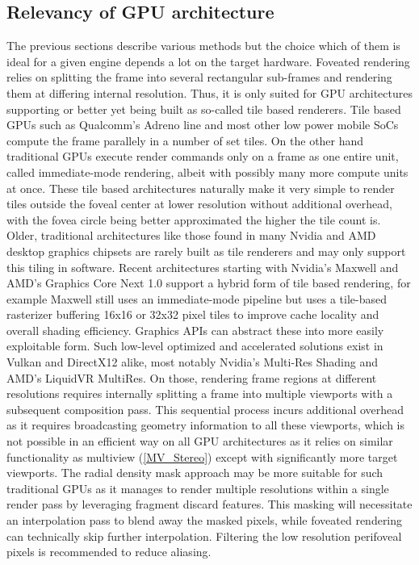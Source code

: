 \subsection{Relevancy of GPU architecture}
The previous sections describe various methods but the choice which of them is ideal for a given engine depends a lot on the target hardware. Foveated rendering relies on splitting the frame into several rectangular sub-frames and rendering them at differing internal resolution. Thus, it is only suited for GPU architectures supporting or better yet being built as so-called tile based renderers. Tile based GPUs such as Qualcomm's Adreno line and most other low power mobile SoCs compute the frame parallely in a number of set tiles. On the other hand traditional GPUs execute render commands only on a frame as one entire unit, called immediate-mode rendering, albeit with possibly many more compute units at once. These tile based architectures naturally make it very simple to render tiles outside the foveal center at lower resolution without additional overhead, with the fovea circle being better approximated the higher the tile count is. \\
Older, traditional architectures like those found in many Nvidia and AMD desktop graphics chipsets are rarely built as tile renderers and may only support this tiling in software. Recent architectures starting with Nvidia's Maxwell and AMD's Graphics Core Next 1.0 support a hybrid form of tile based rendering, for example Maxwell still uses an immediate-mode pipeline but uses a tile-based rasterizer buffering 16x16 or 32x32 pixel tiles to improve cache locality and overall shading efficiency\cite{Kanter.2016}. Graphics APIs can abstract these into more easily exploitable form. Such low-level optimized and accelerated solutions exist in Vulkan and DirectX12 alike, most notably Nvidia's Multi-Res Shading\cite{NvidiaCorporation.2016} and AMD's LiquidVR MultiRes\cite{Gallagher.2016}. On those, rendering frame regions at different resolutions requires internally splitting a frame into multiple viewports with a subsequent composition pass. This sequential process incurs additional overhead as it requires broadcasting geometry information to all these viewports, which is not possible in an efficient way on all GPU architectures as it relies on similar functionality as multiview (\autoref{MV_Stereo}) except with significantly more target viewports. The radial density mask approach may be more suitable for such traditional GPUs as it manages to render multiple resolutions within a single render pass by leveraging fragment discard features. This masking will necessitate an interpolation pass to blend away the masked pixels, while foveated rendering can technically skip further interpolation. Filtering the low resolution perifoveal pixels is recommended to reduce aliasing. 

